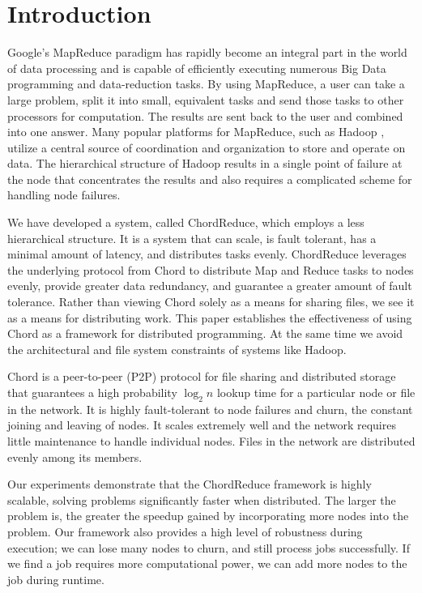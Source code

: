 \documentclass[10pt, conference, compsocconf]{IEEEtran}
\begin{document}
\section{Introduction}
Google's MapReduce \cite{mapreduce} paradigm has rapidly become an integral part in the world of data processing and is capable of efficiently executing numerous Big Data programming and data-reduction tasks.  By using MapReduce, a user can take a large problem, split it into small, equivalent tasks and send those tasks to other processors for computation.  The results are sent back to the user and combined into one answer.  Many popular platforms for MapReduce, such as Hadoop \cite{Hadoop}, utilize a central source of coordination and organization to store and operate on data. The hierarchical structure of Hadoop results in a single point of failure at the node that concentrates the results and also requires a complicated scheme for handling node failures.

We have developed a system, called ChordReduce, which employs a less hierarchical structure.  It is a system that can scale, is fault tolerant, has a minimal amount of latency, and distributes tasks evenly.  ChordReduce leverages the underlying protocol from Chord \cite{Chord} to distribute Map and Reduce tasks to nodes evenly, provide greater data redundancy, and guarantee a greater amount of fault tolerance. Rather than viewing Chord solely as a means for sharing files, we see it as a means for distributing work. This paper establishes the effectiveness of using Chord as a framework for distributed programming.   At the same time we avoid the architectural and file system constraints of systems like Hadoop.  

Chord \cite{Chord} is a peer-to-peer (P2P) protocol for file sharing and distributed storage that guarantees a high probability $\log_{2} n$ lookup time for a particular node or file in the network. It is highly fault-tolerant to node failures and churn, the constant joining and leaving of nodes.  It scales extremely well and the network requires little maintenance to handle individual nodes.  Files in the network are distributed evenly among its members.

Our experiments demonstrate that the ChordReduce framework is highly scalable, solving problems significantly faster when distributed.  The larger the problem is, the greater the speedup gained by incorporating more nodes into the problem.  Our framework also provides a high level of robustness during execution;  we can lose many nodes to churn, and still process jobs successfully.  If we find a job requires more computational power, we can add more nodes to the job during runtime.
\end{document}

